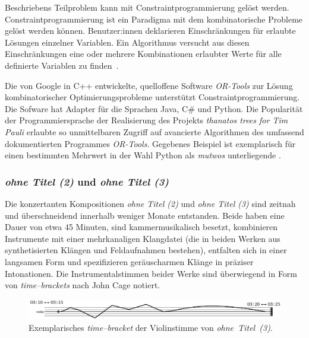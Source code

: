 \documentclass[12pt,a4paper,ngerman]{article}
\begin{document}
\bigskip

Beschriebens Teilproblem kann mit Constraintprogrammierung gelöst werden.
Constraintprogrammierung ist ein Paradigma mit dem kombinatorische Probleme gelöst werden können.
Benutzer:innen deklarieren Einschränkungen für erlaubte Lösungen einzelner Variablen.
Ein Algorithmus versucht aus diesen Einschränkungen eine oder mehrere Kombinationen erlaubter Werte für alle definierte Variablen zu finden~\parencite{constraintProgramming}.

\bigskip

Die von Google in C++ entwickelte, quelloffene Software \emph{OR-Tools} zur Lösung kombinatorischer Optimierungsprobleme unterstützt Constraintprogrammierung.
Die Sofware hat Adapter für die Sprachen Java, C\# und Python.
Die Popularität der Programmiersprache der Realisierung des Projekts \emph{thanatos trees for Tim Pauli} erlaubte so unmittelbaren Zugriff auf avancierte Algorithmen des umfassend dokumentierten Programmes \emph{OR-Tools}.
Gegebenes Beispiel ist exemplarisch für einen bestimmten Mehrwert in der Wahl Python als \emph{mutwos} unterliegende \emph{}.


%
%



\subsubsection{\emph{ohne Titel (2)} und \emph{ohne Titel (3)}}

Die konzertanten Kompositionen \emph{ohne Titel (2)} und \emph{ohne Titel (3)} sind zeitnah und überschneidend innerhalb weniger Monate entstanden.
Beide haben eine Dauer von etwa 45 Minuten, sind kammermusikalisch besetzt, kombinieren Instrumente mit einer mehrkanaligen Klangdatei (die in beiden Werken aus synthetisierten Klängen und Feldaufnahmen bestehen), entfalten sich in einer langsamen Form und spezifizieren geräuscharmen Klänge in präziser Intonationen.
Die Instrumentalstimmen beider Werke sind überwiegend in Form von \emph{time--brackets} nach John Cage notiert.

\bigskip

\begin{figure}[h!]
    \begin{center}
        \includegraphics[scale=0.25]{pictures/time-bracket-ohne-titel-3-2.png}
    \end{center}
    \caption{%
        Exemplarisches \emph{time--bracket} der Violinstimme von \emph{ohne~Titel~(3)}.
    }
\end{figure}
\end{document}
